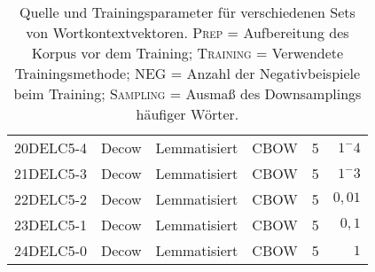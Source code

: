 \begin{table}[h]
\begin{tabular}{@{}llllrr@{}}
  20DELC5-4 & Decow & Lemmatisiert & CBOW & 5 & $1^-4$ \\
  21DELC5-3 & Decow & Lemmatisiert & CBOW & 5 & $1^-3$ \\
  22DELC5-2 & Decow & Lemmatisiert & CBOW & 5 & $0,01$ \\
  23DELC5-1 & Decow & Lemmatisiert & CBOW & 5 & $0,1$ \\
  24DELC5-0 & Decow & Lemmatisiert & CBOW & 5 & $1$ \\
  \bottomrule[1.25pt]
\end{tabular}
\caption[Trainingsparameter der Wortkontextvektoren]{Quelle und Trainingsparameter für verschiedenen Sets von Wortkontextvektoren.
\textsc{Prep} = Aufbereitung des Korpus vor dem Training; \textsc{Training} = Verwendete Trainingsmethode; \textsc{NEG} = Anzahl der
Negativbeispiele beim Training; \textsc{Sampling} = Ausmaß des Downsamplings häufiger Wörter.}
\end{table}
